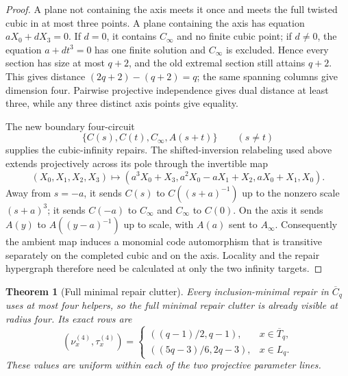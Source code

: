 \documentclass[11pt]{article}
\newtheorem{theorem}{Theorem}[section]
\theoremstyle{definition}
\theoremstyle{remark}
\begin{document}
\begin{proof}
A plane not containing the axis meets it once and meets the full twisted
cubic in at most three points.  A plane containing the axis has equation
$aX_0+dX_3=0$.  If $d=0$, it contains $C_\infty$ and no finite cubic point;
if $d\ne0$, the equation $a+dt^3=0$ has one finite solution and
$C_\infty$ is excluded.  Hence every section has size at most $q+2$, and
the old extremal section still attains
$q+2$.  This gives distance $(2q+2)-(q+2)=q$; the same spanning columns give
dimension four.  Pairwise projective independence gives dual distance at
least three, while any three distinct axis points give equality.

The new boundary four-circuit
\[
 \{C(s),C(t),C_\infty,A(s+t)\}\qquad(s\ne t)
\]
supplies the cubic-infinity repairs.  The shifted-inversion relabeling used
above extends projectively across its pole through the invertible map
\[
 (X_0,X_1,X_2,X_3)\longmapsto
 (a^3X_0+X_3, a^2X_0-aX_1+X_2, aX_0+X_1, X_0).
\]
Away from $s=-a$, it sends $C(s)$ to
$C((s+a)^{-1})$ up to the nonzero scale $(s+a)^3$; it sends $C(-a)$ to
$C_\infty$ and $C_\infty$ to $C(0)$.  On the axis it sends $A(y)$ to
$A((y-a)^{-1})$ up to scale, with $A(a)$ sent to $A_\infty$.
Consequently the ambient map induces a monomial code automorphism that is
transitive separately on the completed cubic and on the axis.  Locality and
the repair hypergraph therefore need be calculated at only the two infinity
targets.
\end{proof}

\begin{theorem}[Full minimal repair clutter]
\label{thm:completed-port}
Every inclusion-minimal repair in $\overline C_q$ uses at most four helpers,
so the full minimal repair clutter is already visible at radius four.  Its
exact rows are
\[
 (\nu_x^{(4)},\tau_x^{(4)})=
 \begin{cases}
 ((q-1)/2,q-1),&x\in\overline T_q,\\[2mm]
 ((5q-3)/6,2q-3),&x\in L_q.
 \end{cases}
\]
These values are uniform within each of the two projective parameter lines.
\end{theorem}
\end{document}
